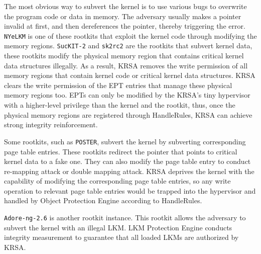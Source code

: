 \documentclass[conference]{IEEEtran}
\begin{document}



The most obvious way to subvert the kernel is to use various bugs to overwrite the program code or data in memory. The adversary usually makes a pointer invalid at first, and then dereferences the pointer, thereby triggering the error. \verb|NYeLKM| is one of these rootkits that exploit the kernel code through modifying the memory regions. \verb|SucKIT-2| and \verb|sk2rc2| are the rootkits that subvert kernel data, these rootkits modify the physical memory region that contains critical kernel data structures illegally. As a result, KRSA removes the write permission of all memory regions that contain kernel code or critical kernel data structures. KRSA clears the write permission of the EPT entries that manage these physical memory regions too. EPTs can only be modified by the KRSA's tiny hypervisor with a higher-level privilege than the kernel and the rootkit, thus, once the physical memory regions are registered through HandleRules, KRSA can achieve strong integrity reinforcement. 

Some rootkits, such as \verb|POSTER|, subvert the kernel by subverting corresponding page table entries. These rootkits redirect the pointer that points to critical kernel data to a fake one. They can also modify the page table entry to conduct re-mapping attack or double mapping attack. KRSA deprives the kernel with the capability of modifying the corresponding page table entries, so any write operation to relevant page table entries would be trapped into the hypervisor and handled by Object Protection Engine according to HandleRules.

\verb|Adore-ng-2.6| is another rootkit instance. This rootkit allows the adversary to subvert the kernel with an illegal LKM. LKM Protection Engine conducts integrity measurement to guarantee that all loaded LKMs are authorized by KRSA.
\end{document}
